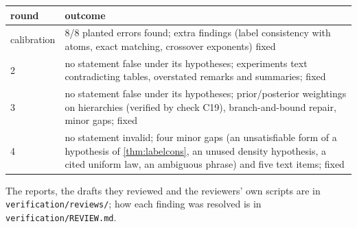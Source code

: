 \documentclass[11pt]{article}
\theoremstyle{definition}
\theoremstyle{remark}
\begin{document}
\begin{center}\small
\begin{tabular}{@{}lp{11.5cm}@{}}\toprule
round & outcome\\\midrule
calibration & 8/8 planted errors found; extra findings (label consistency with atoms, exact matching, crossover exponents) fixed\\
2 & no statement false under its hypotheses; experiments text contradicting tables, overstated remarks and summaries; fixed\\
3 & no statement false under its hypotheses; prior/posterior weightings on hierarchies (verified by check C19), branch-and-bound repair, minor gaps; fixed\\
4 & no statement invalid; four minor gaps (an unsatisfiable form of a hypothesis of \cref{thm:labelcons}, an unused density hypothesis, a cited uniform law, an ambiguous phrase) and five text items; fixed\\
\bottomrule
\end{tabular}
\end{center}

\noindent The reports, the drafts they reviewed and the reviewers' own scripts are in
\texttt{verification/reviews/}; how each finding was resolved is in
\texttt{verification/REVIEW.md}.



\end{document}

